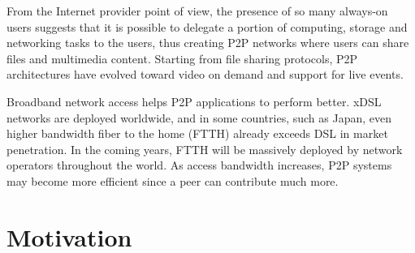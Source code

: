 \documentclass[JIP]{ipsj}
\begin{document}
From the Internet provider point of view, the presence of so many always-on users suggests that it is possible to delegate a portion of computing, storage and networking tasks to the users, thus creating P2P networks where users can share files and multimedia content.
Starting from file sharing protocols, P2P architectures have evolved toward video on demand and support for live events.

Broadband network access helps P2P applications to perform better.
xDSL networks are deployed worldwide, and in some countries, such as Japan, even higher bandwidth fiber to the home (FTTH) already exceeds DSL in market penetration.  In the coming years, FTTH will be massively deployed by network operators throughout the world.  
As access bandwidth increases, P2P systems may become more efficient since a peer can contribute much more.






\section{Motivation}\label{motivation}
\end{document}
